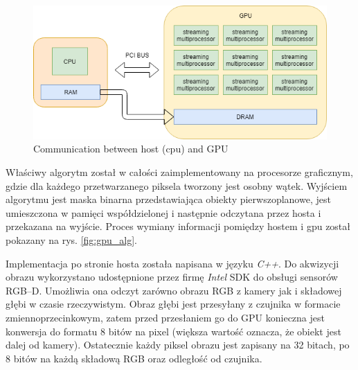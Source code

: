 \documentclass[b5paper,10pt,twoside]{article}
\begin{document}
{\begin{figure}[!t]
	\begin{center}
		\includegraphics[scale=0.50]{img/cpu_host.png}
		\caption{Communication between host (cpu) and GPU}
		\label{fig:cpu_host}
	\end{center}
\end{figure}

Właściwy algorytm został w całości zaimplementowany na procesorze graficznym, gdzie dla każdego przetwarzanego piksela tworzony jest osobny wątek. Wyjściem algorytmu jest maska binarna przedstawiająca obiekty pierwszoplanowe, jest umieszczona w pamięci współdzielonej i następnie odczytana przez hosta i przekazana na wyjście. Proces wymiany informacji pomiędzy hostem i gpu został pokazany na rys. \ref{fig:gpu_alg}.

Implementacja po stronie hosta została napisana w języku \textit{C++}. Do akwizycji obrazu wykorzystano udostępnione przez firmę \textit{Intel} SDK do obsługi sensorów RGB--D. Umożliwia ona odczyt zarówno obrazu RGB z kamery  jak i składowej głębi w czasie rzeczywistym. Obraz głębi jest przesyłany z czujnika w formacie zmiennoprzecinkowym, zatem przed przesłaniem go do GPU konieczna jest konwersja do formatu 8 bitów na pixel (większa wartość oznacza, że obiekt jest dalej od kamery). Ostatecznie każdy piksel obrazu jest zapisany na 32 bitach, po 8 bitów na każdą składową RGB oraz odległość od czujnika. 

}
\end{document}
